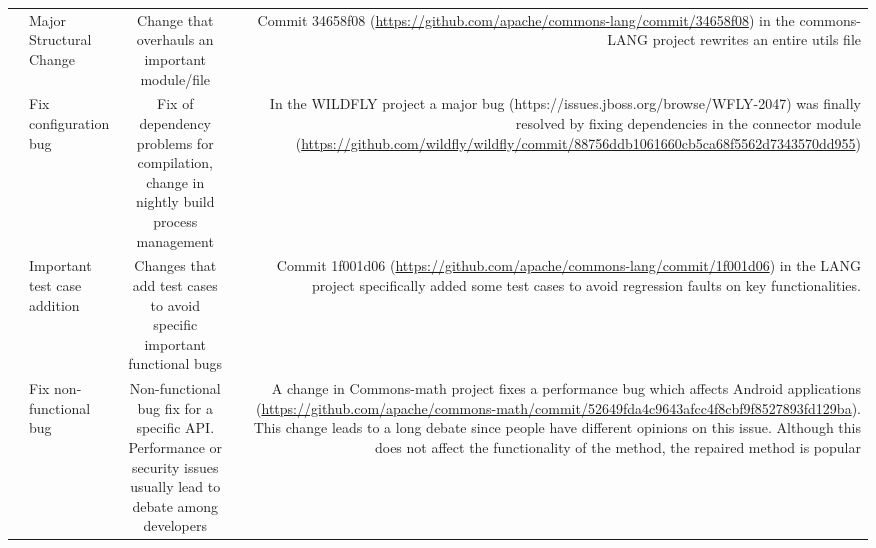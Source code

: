\begin{table} [!h]
\begin{tabular} {r | l | c | r}
	&Major Structural Change & \multicolumn{1}{p{4cm}|}{Change that overhauls an important module/file} & \multicolumn{1}{p{5.5cm}}{Commit 34658f08 ({\tiny \url{https://github.com/apache/commons-lang/commit/34658f08}}) in the commons-LANG project rewrites an entire utils file }\\ \cline{2-4}
	&Fix configuration bug & \multicolumn{1}{p{4cm}|}{Fix of dependency problems for compilation, change in nightly build process management} & \multicolumn{1}{p{5.5cm}}{In the WILDFLY project a major bug (https://issues.jboss.org/browse/WFLY-2047) was finally resolved by fixing dependencies in the connector module ({\tiny \url{https://github.com/wildfly/wildfly/commit/88756ddb1061660cb5ca68f5562d7343570dd955}})}\\ \cline{2-4}
	&Important test case addition & \multicolumn{1}{p{4cm}|}{Changes that add test cases to avoid specific important functional bugs} & \multicolumn{1}{p{5.5cm}}{Commit 1f001d06 ({\tiny \url{https://github.com/apache/commons-lang/commit/1f001d06}}) in the LANG project specifically added some test cases to avoid regression faults on key functionalities.}\\ \hline\hline
	&Fix non-functional bug & \multicolumn{1}{p{4cm}|}{Non-functional bug fix for a specific API. Performance or security issues usually lead to debate among developers } & \multicolumn{1}{p{5.5cm}}{ A change in Commons-math project fixes a performance bug which affects Android applications ({\tiny \url{https://github.com/apache/commons-math/commit/52649fda4c9643afcc4f8cbf9f8527893fd129ba}}). This change leads to a long debate since people have different opinions on this issue. Although this does not affect the functionality of the method, the repaired method is popular}\\\cline{2-4}
		\end{tabular}
\end{table}

